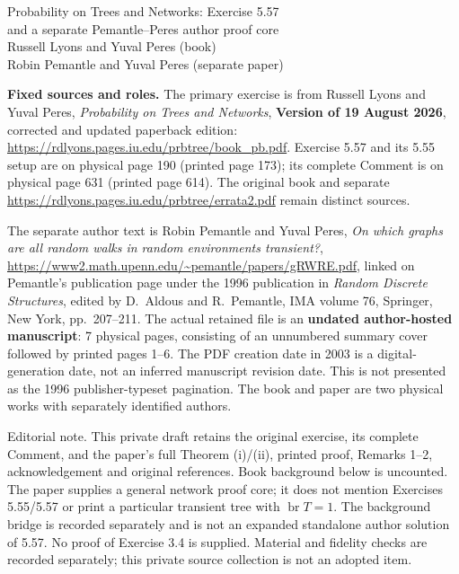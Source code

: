 \documentclass[11pt]{article}
\newcommand{\br}{\operatorname{br}}
\newcommand{\editorial}[1]{\par\smallskip\noindent\textsf{Editorial note.} #1\par\smallskip}
\begin{document}
\begin{center}
{\large Probability on Trees and Networks: Exercise 5.57\\[2pt]
and a separate Pemantle--Peres author proof core}\\[4pt]
Russell Lyons and Yuval Peres (book)\\
Robin Pemantle and Yuval Peres (separate paper)
\end{center}

\small
\noindent\textbf{Fixed sources and roles.}
The primary exercise is from Russell Lyons and Yuval Peres,
\emph{Probability on Trees and Networks}, \textbf{Version of 19 August 2026},
corrected and updated paperback edition:
\url{https://rdlyons.pages.iu.edu/prbtree/book_pb.pdf}.
Exercise 5.57 and its 5.55 setup are on physical page 190 (printed page 173);
its complete Comment is on physical page 631 (printed page 614).
The original book and separate \url{https://rdlyons.pages.iu.edu/prbtree/errata2.pdf}
remain distinct sources.

The separate author text is Robin Pemantle and Yuval Peres,
\emph{On which graphs are all random walks in random environments transient?},
\url{https://www2.math.upenn.edu/~pemantle/papers/gRWRE.pdf}, linked on
Pemantle's publication page under the 1996 publication in
\emph{Random Discrete Structures}, edited by D.~Aldous and R.~Pemantle,
IMA volume 76, Springer, New York, pp.~207--211.
The actual retained file is an \textbf{undated author-hosted manuscript}:
7 physical pages, consisting of an unnumbered summary cover followed by
printed pages 1--6. The PDF creation date in 2003 is a digital-generation
date, not an inferred manuscript revision date. This is not presented as the
1996 publisher-typeset pagination. The book and paper are two physical works
with separately identified authors.

\editorial{This private draft retains the original exercise, its complete
Comment, and the paper's full Theorem (i)/(ii), printed proof, Remarks 1--2,
acknowledgement and original references. Book background below is uncounted.
The paper supplies a general network proof core; it does not mention
Exercises 5.55/5.57 or print a particular transient tree with $\br T=1$.
The background bridge is recorded separately and is not an expanded
standalone author solution of 5.57. No proof of Exercise 3.4 is supplied.
Material and fidelity checks are recorded separately; this private source
collection is not an adopted item.}
\end{document}

